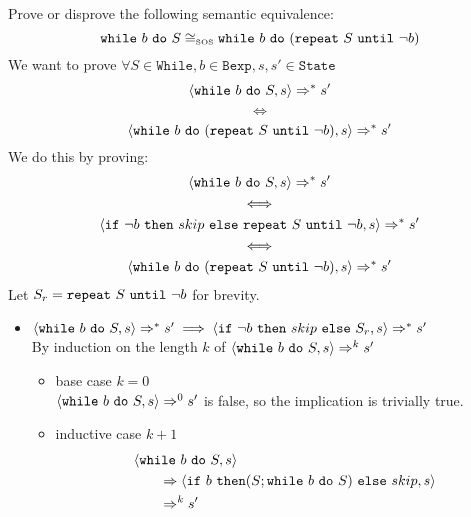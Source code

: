 \begin{exercise}{
    Prove or disprove the following semantic equivalence:
    \[ \texttt{while}\ b\ \texttt{do}\ S \cong_{\text{\tiny SOS}} \texttt{while}\ b\ \texttt{do}\ (\wrepeat{S}{\neg b})  \]\vspace*{-0.6cm}
}
    We want to prove $\forall S \in \texttt{While}, b \in \texttt{Bexp}, s, s' \in \texttt{State}$
    \[ \instr{\texttt{while}\ b\ \texttt{do}\ S}{s} \Rightarrow^* s' \]\vspace*{-0.9cm}
    \[ \iff \]\vspace*{-0.7cm}
    \[ \instr{\texttt{while}\ b\ \texttt{do}\ (\wrepeat{S}{\neg b})}{s} \Rightarrow^* s' \]
    We do this by proving:
    \begin{gather*}
        \instr{\texttt{while}\ b\ \texttt{do}\ S}{s} \Rightarrow^* s' \\
        \iff \\
        \instr{\texttt{if}\ \neg b\ \texttt{then}\ skip\ \texttt{else}\ \wrepeat{S}{\neg b}}{s} \Rightarrow^* s' \\
        \iff \\
        \instr{\texttt{while}\ b\ \texttt{do}\ (\wrepeat{S}{\neg b})}{s} \Rightarrow^* s'
    \end{gather*}
    Let $S_r = \texttt{repeat}\ S\ \texttt{until}\ \neg b$ for brevity.
    \begin{itemize}
        \item $\instr{\texttt{while}\ b\ \texttt{do}\ S}{s} \Rightarrow^* s' \implies \instr{\texttt{if}\ \neg b\ \texttt{then}\ skip\ \texttt{else}\ S_r}{s} \Rightarrow^* s'$ \\
            By induction on the length $k$ of $\instr{\texttt{while}\ b\ \texttt{do}\ S}{s} \Rightarrow^k s'$
            \begin{itemize}
                \item base case $k=0$ \\
                $\left<\texttt{while}\ b\ \texttt{do}\ S, s\right> \Rightarrow^0 s'$ is false, so the implication is trivially true.
                \item inductive case $k+1$ \vspace*{-0.3cm}
                \begin{align*}
                    &\instr{\texttt{while}\ b\ \texttt{do}\ S}{s}
                    \\&\qquad\Rightarrow \instr{\texttt{if}\ b\ \texttt{then} (S; \texttt{while}\ b\ \texttt{do}\ S)\ \texttt{else}\ skip}{s}
                    \\&\qquad\Rightarrow^k s'

\end{align*}
\end{itemize}
\end{itemize}
\end{exercise}
